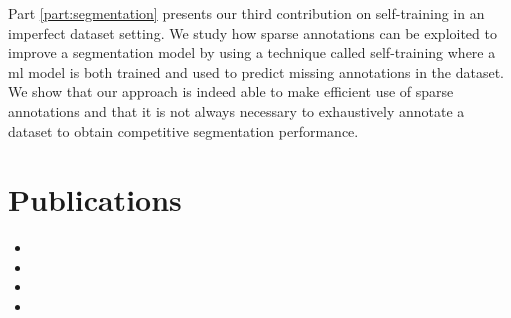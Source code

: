 Part \ref{part:segmentation} presents our third contribution on self-training in an imperfect dataset setting. We study how sparse annotations can be exploited to improve a segmentation model by using a technique called self-training where a \acrlong{ml} model is both trained and used to predict missing annotations in the dataset. We show that our approach is indeed able to make efficient use of sparse annotations and that it is not always necessary to exhaustively annotate a dataset to obtain competitive segmentation performance. 


\section{Publications}

\begin{itemize}
  \item {}
  \item {}
  \item {}
  \item {}
\end{itemize}

